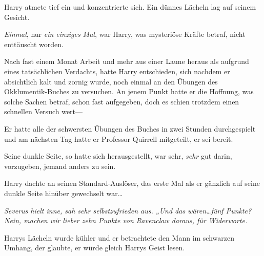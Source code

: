 Harry atmete tief ein und konzentrierte sich. Ein dünnes Lächeln lag auf seinem Gesicht.

\emph{Einmal}, nur \emph{ein einziges Mal}, war Harry, was mysteriöse Kräfte betraf, nicht enttäuscht worden.

Nach fast einem Monat Arbeit und mehr aus einer Laune heraus als aufgrund eines tatsächlichen Verdachts, hatte Harry entschieden, sich nachdem er absichtlich kalt und zornig wurde, noch einmal an den Übungen des Okklumentik-Buches zu versuchen. An jenem Punkt hatte er die Hoffnung, was solche Sachen betraf, schon fast aufgegeben, doch es schien trotzdem einen schnellen Versuch wert—

Er hatte alle der schwersten Übungen des Buches in zwei Stunden durchgespielt und am nächsten Tag hatte er Professor Quirrell mitgeteilt, er sei bereit.

Seine dunkle Seite, so hatte sich herausgestellt, war sehr, \emph{sehr} gut darin, vorzugeben, jemand anders zu sein.

Harry dachte an seinen Standard-Auslöser, das erste Mal als er gänzlich auf seine dunkle Seite hinüber gewechselt war…

\emph{Severus hielt inne, sah sehr selbstzufrieden aus. „Und das wären…fünf Punkte? Nein, machen wir lieber zehn Punkte von Ravenclaw daraus, für Widerworte.}

Harrys Lächeln wurde kühler und er betrachtete den Mann im schwarzen Umhang, der glaubte, er würde gleich Harrys Geist lesen.

